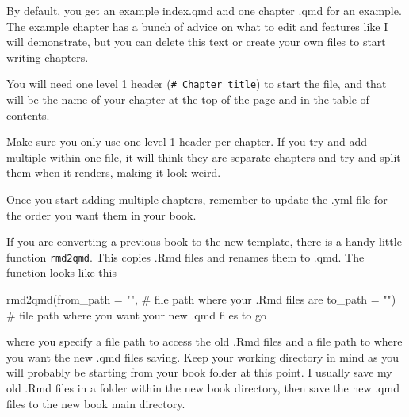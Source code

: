 \documentclass[
  letterpaper,
  DIV=11,
  numbers=noendperiod]{scrreprt}
\newenvironment{Shaded}{\begin{snugshade}}{\end{snugshade}}
\newcommand{\AttributeTok}[1]{\textcolor[rgb]{0.40,0.45,0.13}{#1}}
\newcommand{\CommentTok}[1]{\textcolor[rgb]{0.37,0.37,0.37}{#1}}
\newcommand{\FunctionTok}[1]{\textcolor[rgb]{0.28,0.35,0.67}{#1}}
\newcommand{\NormalTok}[1]{\textcolor[rgb]{0.00,0.23,0.31}{#1}}
\newcommand{\StringTok}[1]{\textcolor[rgb]{0.13,0.47,0.30}{#1}}
\begin{document}
By default, you get an example index.qmd and one chapter .qmd for an
example. The example chapter has a bunch of advice on what to edit and
features like I will demonstrate, but you can delete this text or create
your own files to start writing chapters.

You will need one level 1 header (\texttt{\#\ Chapter\ title}) to start
the file, and that will be the name of your chapter at the top of the
page and in the table of contents.

\begin{tcolorbox}[enhanced jigsaw, colbacktitle=quarto-callout-warning-color!10!white, titlerule=0mm, leftrule=.75mm, title=\textcolor{quarto-callout-warning-color}{\faExclamationTriangle}\hspace{0.5em}{Warning}, breakable, bottomrule=.15mm, opacitybacktitle=0.6, rightrule=.15mm, opacityback=0, arc=.35mm, colframe=quarto-callout-warning-color-frame, toptitle=1mm, bottomtitle=1mm, toprule=.15mm, left=2mm, colback=white, coltitle=black]

Make sure you only use one level 1 header per chapter. If you try and
add multiple within one file, it will think they are separate chapters
and try and split them when it renders, making it look weird.

\end{tcolorbox}

Once you start adding multiple chapters, remember to update the .yml
file for the order you want them in your book.

\begin{tcolorbox}[enhanced jigsaw, colbacktitle=quarto-callout-tip-color!10!white, titlerule=0mm, leftrule=.75mm, title=\textcolor{quarto-callout-tip-color}{\faLightbulb}\hspace{0.5em}{Tip}, breakable, bottomrule=.15mm, opacitybacktitle=0.6, rightrule=.15mm, opacityback=0, arc=.35mm, colframe=quarto-callout-tip-color-frame, toptitle=1mm, bottomtitle=1mm, toprule=.15mm, left=2mm, colback=white, coltitle=black]

If you are converting a previous book to the new template, there is a
handy little function \texttt{rmd2qmd}. This copies .Rmd files and
renames them to .qmd. The function looks like this

\begin{Shaded}
\begin{Highlighting}[]
\FunctionTok{rmd2qmd}\NormalTok{(}\AttributeTok{from\_path =} \StringTok{""}\NormalTok{,  }\CommentTok{\# file path where your .Rmd files are}
        \AttributeTok{to\_path =} \StringTok{""}\NormalTok{) }\CommentTok{\# file path where you want your new .qmd files to go}
\end{Highlighting}
\end{Shaded}

where you specify a file path to access the old .Rmd files and a file
path to where you want the new .qmd files saving. Keep your working
directory in mind as you will probably be starting from your book folder
at this point. I usually save my old .Rmd files in a folder within the
new book directory, then save the new .qmd files to the new book main
directory.

\end{tcolorbox}
\end{document}
